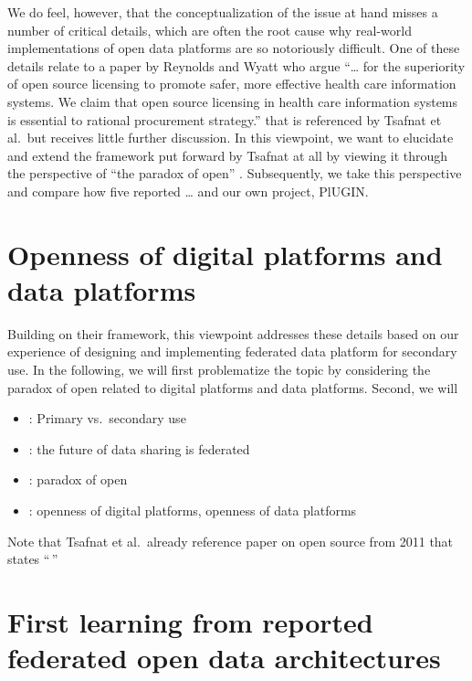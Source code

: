 \documentclass[
  authoryear]{elsarticle}
\providecommand{\tightlist}{%
  \setlength{\itemsep}{0pt}\setlength{\parskip}{0pt}}\usepackage{longtable,booktabs,array}
\begin{document}
We do feel, however, that the conceptualization of the issue at hand
misses a number of critical details, which are often the root cause why
real-world implementations of open data platforms are so notoriously
difficult. One of these details relate to a paper by Reynolds and Wyatt
who argue ``\ldots{} for the superiority of open source licensing to
promote safer, more effective health care information systems. We claim
that open source licensing in health care information systems is
essential to rational procurement strategy.'' \citep{reynolds2011open}
that is referenced by Tsafnat et al.~but receives little further
discussion. In this viewpoint, we want to elucidate and extend the
framework put forward by Tsafnat at all by viewing it through the
perspective of ``the paradox of open'' \citep{keller2021paradox}.
Subsequently, we take this perspective and compare how five reported
\ldots{} and our own project, PlUGIN.

\section{Openness of digital platforms and data
platforms}\label{openness-of-digital-platforms-and-data-platforms}

Building on their framework, this viewpoint addresses these details
based on our experience of designing and implementing federated data
platform for secondary use. In the following, we will first problematize
the topic by considering the paradox of open related to digital
platforms and data platforms. Second, we will

\begin{itemize}
\tightlist
\item
  \citep{cascini2024health}: Primary vs.~secondary use
\item
  \citep{rieke2020future}: the future of data sharing is federated
\item
  \citep{keller2021paradox}: paradox of open
\item
  \citep{dereuver2018digital, dereuver2022openness}: openness of digital
  platforms, openness of data platforms
\end{itemize}

Note that Tsafnat et al.~already reference paper on open source from
2011 that states ``\,''

\section{First learning from reported federated open data
architectures}\label{first-learning-from-reported-federated-open-data-architectures}
\end{document}
